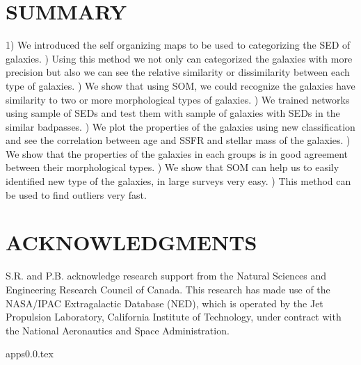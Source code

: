 \documentclass[useAMS,usenatbib]{mn2e}
\begin{document}
\section{SUMMARY}
\label{sec: summary} %
1) We introduced the self organizing maps to be used to categorizing the SED of galaxies.
) Using this method we not only can categorized the galaxies with more precision but also we can see the relative similarity or dissimilarity between each type of galaxies.  
) We show that using SOM, we could recognize the galaxies have similarity to two or more morphological types of galaxies.
) We trained networks using sample of SEDs and test them with sample of galaxies with SEDs in the similar badpasses.
) We plot the properties of the galaxies using new classification and see the correlation between age and SSFR and stellar mass of the galaxies.
) We show that the properties of the galaxies in each groups is in good agreement between their morphological types.
) We show that SOM can help us to easily identified new type of the galaxies, in large surveys very easy. 
) This method can be used to find outliers very fast.
\newline

\section*{ACKNOWLEDGMENTS}
S.R. and P.B. acknowledge research support from the Natural Sciences and Engineering Research Council of Canada. This research has made use of the NASA/IPAC Extragalactic Database (NED), which is operated by the Jet Propulsion Laboratory, California Institute of Technology, under contract with the National Aeronautics and Space Administration.



{apps0.0.tex}
\end{document}

